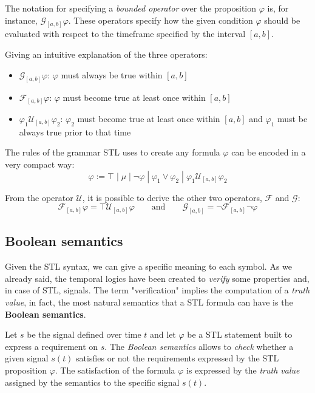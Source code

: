 The notation for specifying a \textit{bounded operator} over the proposition $\varphi$ is, for instance, $\mathcal{G}_{[a,b]}\varphi$.
These operators specify how the given condition $\varphi$ should be evaluated with respect to the timeframe specified by the interval $[a,b]$.

Giving an intuitive explanation of the three operators:
\begin{itemize}
  \item $\mathcal{G}_{[a,b]}\varphi$: $\varphi$ must always be true within $[a,b]$
  \item $\mathcal{F}_{[a,b]}\varphi$: $\varphi$ must become true at least once within $[a,b]$
  \item $\varphi_1\mathcal{U}_{[a,b]}\varphi_2$: $\varphi_2$ must become true
at least once within $[a,b]$ and $\varphi_1$ must be always
true prior to that time
\end{itemize}

The rules of the grammar STL uses to create any formula $\varphi$ can be encoded in a very compact way:
$$ \varphi := \top \;|\; \mu \;|\; \neg\varphi \;|\;
\varphi_1 \lor \varphi_2 \;|\; \varphi_1 \mathcal{U}_{[a,b]} \varphi_2 $$

From the operator $\mathcal{U}$, it is possible to derive the other two operators, $\mathcal{F}$ and $\mathcal{G}$:
$$ \mathcal{F}_{[a,b]}\varphi = \top \mathcal{U}_{[a,b]}\varphi
\qquad \text{and} \qquad
\mathcal{G}_{[a,b]} = \neg\mathcal{F}_{[a,b]}\neg\varphi $$


\subsection{Boolean semantics}
Given the STL syntax, we can give a specific meaning to each symbol.
As we already said, the temporal logics have been created to \textit{verify} some properties and, in case of STL, signals.
The term "verification" implies the computation of a \textit{truth value}, in fact, the most natural semantics that a STL formula can have is the \textbf{Boolean semantics}.

Let $s$ be the signal defined over time $t$ and let $\varphi$ be a STL statement built to express a requirement on $s$.
The \textit{Boolean semantics} allows to \textit{check} whether a given signal $s(t)$ satisfies or not the requirements expressed by the STL proposition $\varphi$.
The satisfaction of the formula $\varphi$ is expressed by the \textit{truth value} assigned by the semantics to the specific signal $s(t)$.

